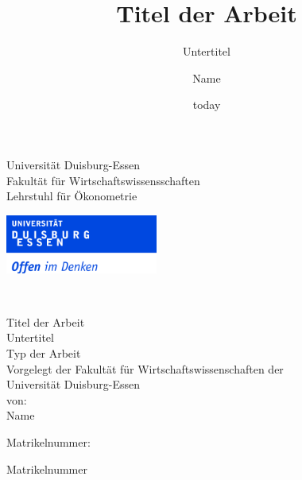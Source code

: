 \documentclass[11pt,]{article}
\title{Titel der Arbeit}
\subtitle{Untertitel}
\author{Name}
\date{today}
\begin{document}

\begin{titlepage}
  \noindent\begin{minipage}{0.6\textwidth}
	  Universität Duisburg-Essen\\
	  Fakultät für Wirtschaftswissensschaften\\
	  Lehrstuhl für Ökonometrie\\
  \end{minipage}
	\begin{minipage}{0.4\textwidth}
	  \begin{flushright}
  	  \vspace{-0.5cm}
  	  \includegraphics*[width=5cm]{Includes/duelogo.jpg} %
	  \end{flushright}
	\end{minipage}
  \\
  \vspace{1.5cm}
  \begin{center}
  \huge{Titel der Arbeit}\\
  \vspace{.25cm}
  \Large{Untertitel}\\
  \vspace{0.5cm}
  \large{Typ der Arbeit}\\
  \vspace{1cm}
  \large{Vorgelegt der Fakultät für Wirtschaftswissenschaften der \\ Universität Duisburg-Essen}\\
  \vspace{0.75cm}
  \large{von:}\\
  \vspace{0.5cm}
  Name\\
  \end{center}
  \vspace{4cm}
  
  \noindent\begin{minipage}[t]{0.3\textwidth}
  Matrikelnummer:
  \end{minipage}
  \begin{minipage}[t]{0.7\textwidth}
  \hspace{1cm}Matrikelnummer
  \end{minipage}  
  

\end{titlepage}
\end{document}

